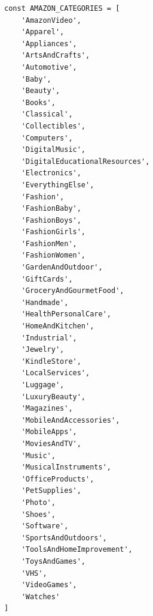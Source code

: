 \documentclass[specification,annotation,times]{itmo-student-thesis}
\begin{document}
\begin{lstlisting}[style=ES6, caption={Список допустимых категорий товаров на Amazon}]
const AMAZON_CATEGORIES = [
    'AmazonVideo',
    'Apparel',
    'Appliances',
    'ArtsAndCrafts',
    'Automotive',
    'Baby',
    'Beauty',
    'Books',
    'Classical',
    'Collectibles',
    'Computers',
    'DigitalMusic',
    'DigitalEducationalResources',
    'Electronics',
    'EverythingElse',
    'Fashion',
    'FashionBaby',
    'FashionBoys',
    'FashionGirls',
    'FashionMen',
    'FashionWomen',
    'GardenAndOutdoor',
    'GiftCards',
    'GroceryAndGourmetFood',
    'Handmade',
    'HealthPersonalCare',
    'HomeAndKitchen',
    'Industrial',
    'Jewelry',
    'KindleStore',
    'LocalServices',
    'Luggage',
    'LuxuryBeauty',
    'Magazines',
    'MobileAndAccessories',
    'MobileApps',
    'MoviesAndTV',
    'Music',
    'MusicalInstruments',
    'OfficeProducts',
    'PetSupplies',
    'Photo',
    'Shoes',
    'Software',
    'SportsAndOutdoors',
    'ToolsAndHomeImprovement',
    'ToysAndGames',
    'VHS',
    'VideoGames',
    'Watches'
]
\end{lstlisting}
\end{document}
